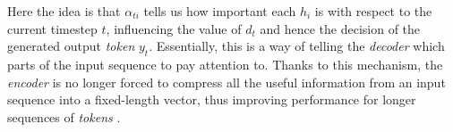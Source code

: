 Here the idea is that $\alpha_{ti}$ tells us how important each $h_i$ is with respect to the current timestep $t$, influencing the value of $d_t$ and hence the decision of the generated output \textit{token} $y_t$. Essentially, this is a way of telling the \textit{decoder} which parts of the input sequence to pay attention to. Thanks to this mechanism, the \textit{encoder} is no longer forced to compress all the useful information from an input sequence into a fixed-length vector, thus improving performance for longer sequences of \textit{tokens} \cite{bahdanau_neural_2016}.